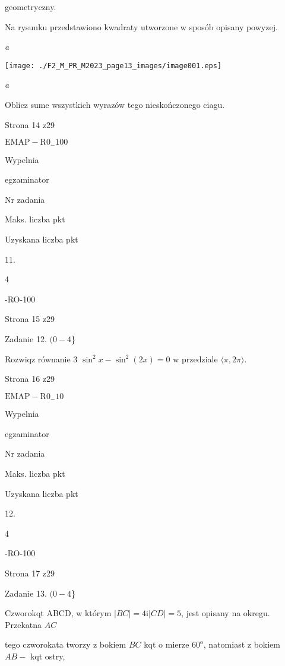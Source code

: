 \documentclass[a4paper,12pt]{article}
\begin{document}
geometryczny.

Na rysunku przedstawiono kwadraty utworzone w sposób opisany powyzej.

{\it a}
\begin{center}
\texttt{[image: ./F2\_M\_PR\_M2023\_page13\_images/image001.eps]}
\end{center}
{\it a}

Oblicz sume wszystkich wyrazów tego nieskończonego ciagu.

Strona 14 z29

$\mathrm{E}\mathrm{M}\mathrm{A}\mathrm{P}-\mathrm{R}0_{-}100$





Wypelnia

egzaminator

Nr zadania

Maks. liczba pkt

Uzyskana liczba pkt

11.

4

-RO-100

Strona 15 z29





Zadanie 12. $(0-4$\}

Rozwiqz równanie 3 $\sin^{2}x-\sin^{2}(2x)=0$ w przedziale $\langle\pi, 2\pi\rangle.$

Strona 16 z29

$\mathrm{E}\mathrm{M}\mathrm{A}\mathrm{P}-\mathrm{R}0_{-}10$





Wypelnia

egzaminator

Nr zadania

Maks. liczba pkt

Uzyskana liczba pkt

12.

4

-RO-100

Strona 17 z29





Zadanie 13. $(0-4$\}

Czworokqt ABCD, w którym $|BC|=4 \mathrm{i} |CD|=5$, jest opisany na okregu. Przekatna $AC$

tego czworokata tworzy z bokiem $BC$ kqt o mierze $60^{\mathrm{o}}$, natomiast z bokiem $AB-$ kqt ostry,
\end{document}
